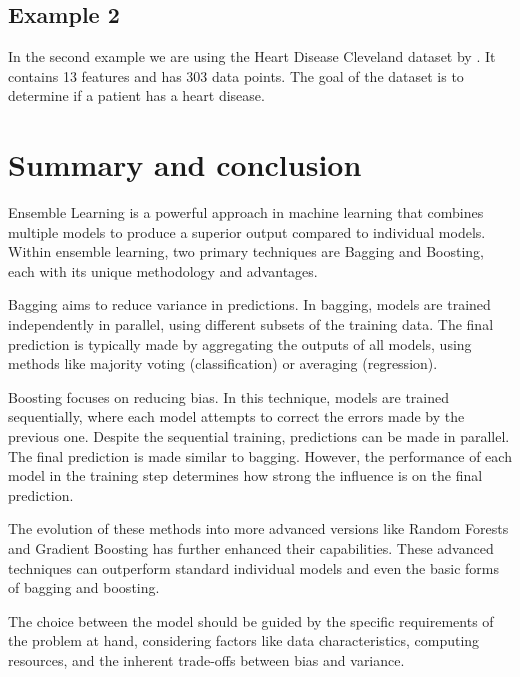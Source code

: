 

\newpage
\subsection{Example 2}
In the second example we are using the Heart Disease Cleveland dataset by
\citet*{heart_disease_cleveland}. It contains 13 features and has 303 data 
points. The goal of the dataset is to determine if a patient has a heart
disease.




\section{Summary and conclusion}
Ensemble Learning is a powerful approach in machine learning that combines 
multiple models to produce a superior output compared to individual models.
Within ensemble learning, two primary techniques are Bagging and Boosting, 
each with its unique methodology and advantages.


Bagging aims to reduce variance in predictions. In bagging, models are trained 
independently in parallel, using different subsets of the training data.
The final prediction is typically made by aggregating the outputs of all models,
using methods like majority voting (classification) or averaging (regression).


Boosting focuses on reducing bias. In this technique, models are trained sequentially,
where each model attempts to correct the errors made by the previous one. Despite 
the sequential training, predictions can be made in parallel. The final prediction
is made similar to bagging. However, the performance of each model in the training 
step determines how strong the influence is on the final prediction.


The evolution of these methods into more advanced versions like Random Forests
and Gradient Boosting has further enhanced their capabilities. These advanced 
techniques can outperform standard individual models and even the basic forms 
of bagging and boosting. 


The choice between the model should be guided by the specific requirements of 
the problem at hand, considering factors like data characteristics, computing 
resources, and the inherent trade-offs between bias and variance.
